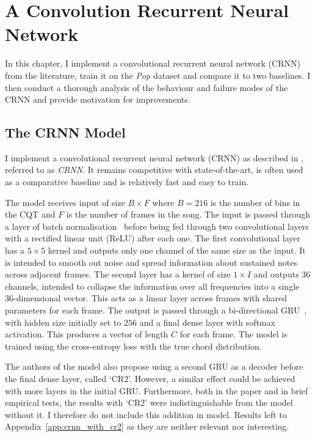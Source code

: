 \chapter{A Convolution Recurrent Neural Network}

In this chapter, I implement a convolutional recurrent neural network (CRNN) from the literature, train it on the \emph{Pop} dataset and compare it to two baselines. I then conduct a thorough analysis of the behaviour and failure modes of the CRNN and provide motivation for improvements. 

\section{The CRNN Model}\label{sec:crnn}

I implement a convolutional recurrent neural network (CRNN) as described in \citet{StructuredTraining}, referred to as \emph{CRNN}. It remains competitive with state-of-the-art, is often used as a comparative baseline and is relatively fast and easy to train.

The model receives input of size $B \times F$ where $B=216$ is the number of bins in the CQT and $F$ is the number of frames in the song. The input is passed through a layer of batch normalisation~\citep{BatchNorm} before being fed through two convolutional layers with a rectified linear unit (ReLU) after each one. The first convolutional layer has a $5\times 5$ kernel and outputs only one channel of the same size as the input. It is intended to smooth out noise and spread information about sustained notes across adjacent frames. The second layer has a kernel of size $1\times I$ and outputs 36 channels, intended to collapse the information over all frequencies into a single 36-dimensional vector. This acts as a linear layer across frames with shared parameters for each frame. The output is passed through a bi-directional GRU~\citep{GRU}, with hidden size initially set to $256$ and a final dense layer with softmax activation. This produces a vector of length $C$ for each frame. The model is trained using the cross-entropy loss with the true chord distribution.

The authors of the model also propose using a second GRU as a decoder before the final dense layer, called `CR2'. However, a similar effect could be achieved with more layers in the initial GRU. Furthermore, both in the paper and in brief empirical tests, the results with `CR2' were indistinguishable from the model without it. I therefore do not include this addition in model. Results left to Appendix~\ref{app:crnn_with_cr2} as they are neither relevant nor interesting.

